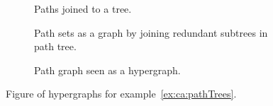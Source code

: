 \documentclass[\master/Master.tex]{subfiles}
\begin{document}
\begin{figure}
    \centering
    \begin{subfigure}[t]{0.30\textwidth}
        \centering
        \raisebox{-0.5\height}{\resizebox{\linewidth}{!}{}}
        \caption{Paths joined to a tree.}
        \label{fig:ca:graphExTree}
    \end{subfigure}%
    \hfill%
    \begin{subfigure}[t]{0.30\textwidth}
        \centering
        \resizebox{1\linewidth}{!}{\raisebox{-0.5\height}{}}
        \caption{Path sets as a graph by joining redundant subtrees in path tree.}
        \label{fig:ca:graphExGraph}
    \end{subfigure}
    \hfill%
    \begin{subfigure}[t]{0.30\textwidth}
        \centering
        \resizebox{1\linewidth}{!}{\raisebox{-0.5\height}{}}
        \caption{Path graph seen as a hypergraph.}
        \label{fig:ca:graphExHG}
    \end{subfigure}
    \caption{Figure of hypergraphs for example~\ref{ex:ca:pathTrees}.}\label{fig:ex:ca:hgi}
\end{figure}
%
%
%
\end{document}
